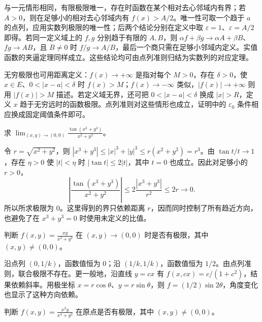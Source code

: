 与一元情形相同，有限极限唯一，存在时函数在某个相对去心邻域内有界；若 $A>0$，则在足够小的相对去心邻域内有 $f(x)>A/2$。唯一性可取一个趋于 $a$ 的点列，应用实数列极限的唯一性；后两个结论分别在定义中取 $\varepsilon=1$、$\varepsilon=A/2$ 即得。若同一定义域上的 $f,g$ 分别趋于有限的 $A,B$，则 $\alpha f+\beta g\to\alpha A+\beta B$、$fg\to AB$，且 $B\neq0$ 时 $f/g\to A/B$，最后一个商只需在足够小邻域内定义。实值函数的夹逼定理同样成立。这些结论均可由点列准则归结为实数列的对应定理。

无穷极限也可用距离定义：$f(x)\to+\infty$ 是指对每个 $M>0$，存在 $\delta>0$，使 $x\in E$、$0<|x-a|<\delta$ 时 $f(x)>M$；$f(x)\to-\infty$ 类似，$|f(x)|\to+\infty$ 则用 $|f(x)|>M$ 描述。若定义域无界，还可把 $0<|x-a|<\delta$ 换成 $|x|>R$，定义 $x$ 趋于无穷远时的函数极限。点列准则对这些情形也成立，证明中的 $\varepsilon_0$ 条件相应换成固定阈值条件即可。

\begin{example}
\label{ex:multivariable-tangent-cubic-limit}
求 $\displaystyle\lim_{(x,y)\to(0,0)}\frac{\tan(x^3+y^3)}{x^2+y^2}$。
\end{example}

\begin{solve}
令 $r=\sqrt{x^2+y^2}$，则 $|x^3+y^3|\leq|x|^3+|y|^3\leq r(x^2+y^2)=r^3$。由 $\tan t/t\to1$，存在 $\eta>0$ 使 $|t|<\eta$ 时 $|\tan t|\leq2|t|$，其中 $t=0$ 也成立。因此对足够小的 $r>0$，
\[
    \left|\frac{\tan(x^3+y^3)}{x^2+y^2}\right|
       \leq2\frac{|x^3+y^3|}{r^2}\leq2r\to0.
\]
所以所求极限为 $0$。这里得到的界只依赖距离 $r$，因而同时控制了所有趋近方向，也避免了在 $x^3+y^3=0$ 时使用未定义的比值。
\end{solve}

\begin{example}
\label{ex:multivariable-xy-direction-dependent-limit}
判断 $\displaystyle f(x,y)=\frac{xy}{x^2+y^2}$ 在 $(x,y)\to(0,0)$ 时是否有极限，其中 $(x,y)\neq(0,0)$。
\end{example}

\begin{solve}
沿点列 $(0,1/k)$，函数值恒为 $0$；沿 $(1/k,1/k)$，函数值恒为 $1/2$。由点列准则，联合极限不存在。更一般地，沿直线 $y=cx$ 有 $f(x,cx)=c/(1+c^2)$，结果依赖斜率。用极坐标 $x=r\cos\theta$、$y=r\sin\theta$，则 $f=(1/2)\sin2\theta$，角度变化也显示了这种方向依赖。
\end{solve}

\begin{example}
\label{ex:all-line-limits-insufficient}
判断 $\displaystyle f(x,y)=\frac{x^2y}{x^4+y^2}$ 在原点是否有极限，其中 $(x,y)\neq(0,0)$。
\end{example}

